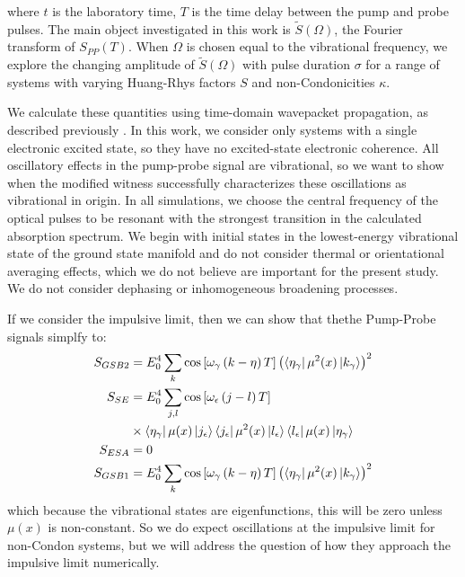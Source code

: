 where $t$ is the laboratory time, $T$ is the time delay between the pump and probe pulses. The main object investigated in this work is $\tilde{S}(\Omega)$, the Fourier transform of $S_{PP}(T)$. When $\Omega$ is chosen equal to the vibrational frequency, we explore the changing amplitude of $\tilde{S}(\Omega)$ with pulse duration $\sigma$ for a range of systems with varying Huang-Rhys factors $S$ and non-Condonicities $\kappa$.

We calculate these quantities using time-domain wavepacket propagation, as described previously \cite{Mukamel1995,UFSwavepackets,Tannor2007,technique}.  In this work, we consider only systems with a single electronic excited state, so they have no excited-state electronic coherence. All oscillatory effects in the pump-probe signal are vibrational, so we want to show when the modified witness successfully characterizes these oscillations as vibrational in origin. In all simulations, we choose the central frequency of the optical pulses to be resonant with the strongest transition in the calculated absorption spectrum. We begin with initial states in the lowest-energy vibrational state of the ground state manifold and do not consider thermal or orientational averaging effects, which we do not believe are important for the present study. We do not consider dephasing or inhomogeneous broadening processes.

If we consider the impulsive limit, then we can show that thethe Pump-Probe signals simplfy to:
\begin{align}
	S_{GSB2} &=  E_0^4 \sum_{k}   \cos \left[  \omega_{\gamma}  \left(   k - \eta \right) T \right]  \left(  \bra{\eta_{\gamma}}  \mu^2 (x) \ket{k_{\gamma}} \right)^2 \\
	S_{SE} &= E_0^4 \sum_{j, l}   \cos  \left[\omega_{\epsilon}  \left(   j - l \right) T \right]   \\
	&\times \bra{\eta_{\gamma}}  \mu (x) \ket{j_{\epsilon}} \bra{j_{\epsilon}}  \mu^2 (x) \ket{l_{\epsilon}} \bra{l_{\epsilon}}  \mu (x) \ket{\eta_{\gamma}}   \\
	S_{ESA} &= 0 \\
	S_{GSB1} &=  E_0^4 \sum_{k}  \cos  \left[ \omega_{\gamma}  \left(   k - \eta \right) T  \right]   \left(  \bra{\eta_{\gamma}}  \mu^2 (x) \ket{k_{\gamma}} \right)^2
\end{align}
which because the vibrational states are eigenfunctions, this will be zero unless $\mu(x)$ is non-constant.  So we do expect oscillations at the impulsive limit for non-Condon systems, but we will address the question of how they approach the impulsive limit numerically.

